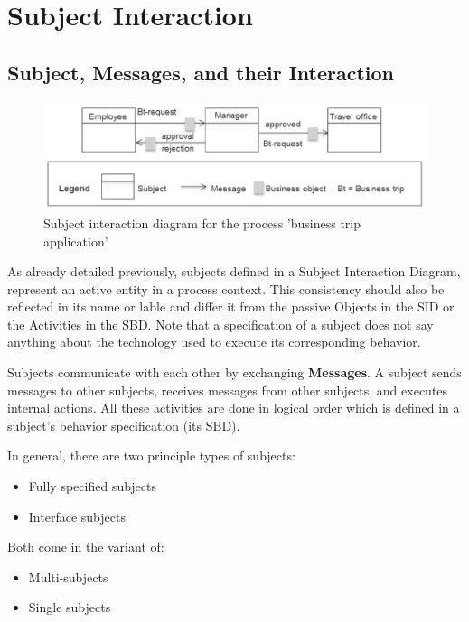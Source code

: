 \section{Subject Interaction}

\subsection{Subject, Messages, and their Interaction}
\label{sec: Subject}


\begin{figure}[htbp]
	\centering
	\includegraphics[width=14cm]{Figures/Ontology/SubjectInteraction/Beispiel-Subject-Interaction.png}
	\caption[Subject interaction diagram]{Subject interaction diagram for the process 'business trip application'}
	\label{fig:beispiel-SubjectInteraction}
\end{figure}

As already detailed previously, subjects defined in a Subject Interaction Diagram, represent an active entity in a process context. This consistency should also be reflected in its name or lable and differ it from the passive Objects in the SID or the Activities in the SBD. Note that a specification of a subject does not say anything about the technology used to execute its corresponding behavior. 

Subjects communicate with each other by exchanging \textbf{Messages}. A subject sends messages to other subjects, receives messages from other subjects, and executes internal actions. All these activities are done in logical order which is defined in a subject's behavior specification (its SBD).

In general, there are two principle types of subjects:

\begin{itemize}
	\item Fully specified subjects
	\item Interface subjects 
\end{itemize}

Both come in the variant of:

\begin{itemize}
    \item Multi-subjects
	\item Single subjects
\end{itemize}

